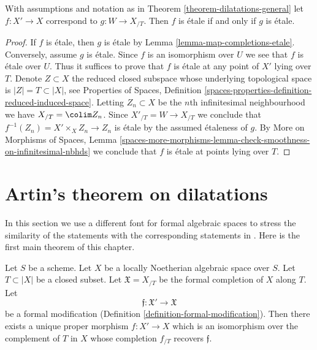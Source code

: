 \begin{lemma}
\label{lemma-output-etale}
With assumptions and notation as in Theorem \ref{theorem-dilatations-general}
let $f : X' \to X$ correspond to $g : W \to X_{/T}$.
Then $f$ is \'etale if and only if $g$ is \'etale.
\end{lemma}

\begin{proof}
If $f$ is \'etale, then $g$ is \'etale by
Lemma \ref{lemma-map-completions-etale}.
Conversely, assume $g$ is \'etale.
Since $f$ is an isomorphism over $U$ we see that $f$ is \'etale
over $U$. Thus it suffices to prove that $f$ is \'etale
at any point of $X'$ lying over $T$. Denote $Z \subset X$
the reduced closed subspace whose underlying topological
space is $|Z| = T \subset |X|$, see
Properties of Spaces, Definition
\ref{spaces-properties-definition-reduced-induced-space}.
Letting $Z_n \subset X$ be the $n$th infinitesimal neighbourhood
we have $X_{/T} = \colim Z_n$. Since $X'_{/T} = W \to X_{/T}$
we conclude that $f^{-1}(Z_n) = X' \times_X Z_n \to Z_n$
is \'etale by the assumed \'etaleness of $g$.
By More on Morphisms of Spaces, Lemma
\ref{spaces-more-morphisms-lemma-check-smoothness-on-infinitesimal-nbhds}
we conclude that $f$ is \'etale at points lying over $T$.
\end{proof}





\section{Artin's theorem on dilatations}
\label{section-dilatations}

\noindent
In this section we use a different font for formal algebraic spaces
to stress the similarity of the statements with the corresponding
statements in \cite{ArtinII}. Here is the first main theorem of this chapter.

\begin{theorem}
\label{theorem-dilatations}
\begin{reference}
\cite[Theorem 3.2]{ArtinII}
\end{reference}
Let $S$ be a scheme. Let $X$ be a locally Noetherian algebraic space over $S$.
Let $T \subset |X|$ be a closed subset. Let
$\mathfrak X = X_{/T}$
be the formal completion of $X$ along $T$. Let
$$
\mathfrak f : \mathfrak X' \to \mathfrak X
$$
be a formal modification (Definition \ref{definition-formal-modification}).
Then there exists a unique proper morphism $f : X' \to X$ which is an
isomorphism over the complement of $T$ in $X$ whose completion $f_{/T}$
recovers $\mathfrak f$. 
\end{theorem}

